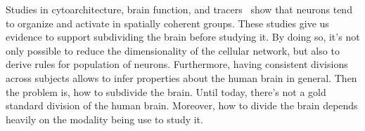 Studies in cytoarchitecture\cite{Brodmann1909, VonEconomo1925}, brain
function\cite{Penfield1954, VonderMalsburg1994}, and tracers~\cite{Schmahmann2006, Stephan2013}
show that neurons tend to organize and activate in spatially coherent groups.
These studies give us evidence to support subdividing the brain before studying
it. By doing so, it's not only possible to reduce the dimensionality of the
cellular network, but also to derive rules for population of neurons. Furthermore,
having consistent divisions across subjects allows to infer properties about the
human brain in general. Then the problem is, how to subdivide the brain. Until
today, there's not a gold standard division of the human brain. Moreover, how
to divide the brain depends heavily on the modality being use to study it.



